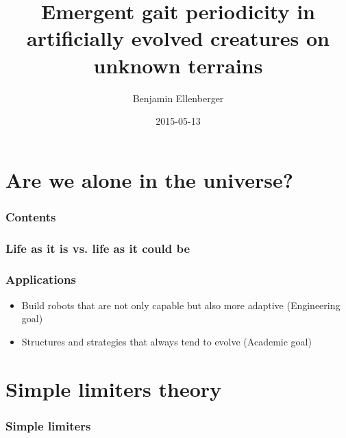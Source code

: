 \documentclass{beamer}
\author{Benjamin Ellenberger}
\institute{INI:  Institute of Neuroinformatics}
\title{Emergent gait periodicity in artificially evolved creatures on unknown terrains}
\date{2015-05-13}
\begin{document}
\titleframe

\section{Are we alone in the universe?}

\begin{frame}

  \frametitle{Contents}
  \tableofcontents[currentsection]
\end{frame}

\begin{frame}

	\frametitle{Life as it is vs. life as it could be}

\end{frame}



\begin{frame}

	\frametitle{Applications}
	\begin{itemize}
	\item Build robots that are not only capable but also more adaptive (Engineering goal)
	\item Structures and strategies that always tend to evolve (Academic goal)
	\end{itemize}
\end{frame}

\section{Simple limiters theory}

\begin{frame}
	\frametitle{Simple limiters}
\end{frame}
\end{document}
